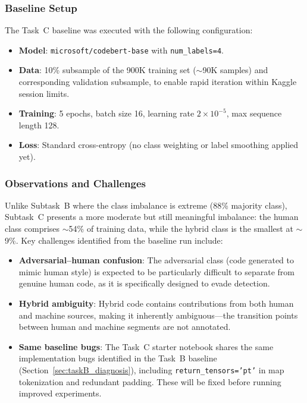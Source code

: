 \documentclass[11pt]{article}
\begin{document}
\subsubsection{Baseline Setup}

The Task~C baseline was executed with the following configuration:
\begin{itemize}
    \item \textbf{Model}: \texttt{microsoft/codebert-base} with \texttt{num\_labels=4}.
    \item \textbf{Data}: 10\% subsample of the 900K training set ($\sim$90K samples) and corresponding validation subsample, to enable rapid iteration within Kaggle session limits.
    \item \textbf{Training}: 5 epochs, batch size 16, learning rate $2{\times}10^{-5}$, max sequence length 128.
    \item \textbf{Loss}: Standard cross-entropy (no class weighting or label smoothing applied yet).
\end{itemize}

\subsubsection{Observations and Challenges}

Unlike Subtask~B where the class imbalance is extreme (88\% majority class), Subtask~C presents a more moderate but still meaningful imbalance: the human class comprises $\sim$54\% of training data, while the hybrid class is the smallest at $\sim$9\%. Key challenges identified from the baseline run include:

\begin{itemize}
    \item \textbf{Adversarial--human confusion}: The adversarial class (code generated to mimic human style) is expected to be particularly difficult to separate from genuine human code, as it is specifically designed to evade detection.
    \item \textbf{Hybrid ambiguity}: Hybrid code contains contributions from both human and machine sources, making it inherently ambiguous---the transition points between human and machine segments are not annotated.
    \item \textbf{Same baseline bugs}: The Task~C starter notebook shares the same implementation bugs identified in the Task~B baseline (Section~\ref{sec:taskB_diagnosis}), including \texttt{return\_tensors='pt'} in map tokenization and redundant padding. These will be fixed before running improved experiments.
\end{itemize}
\end{document}
